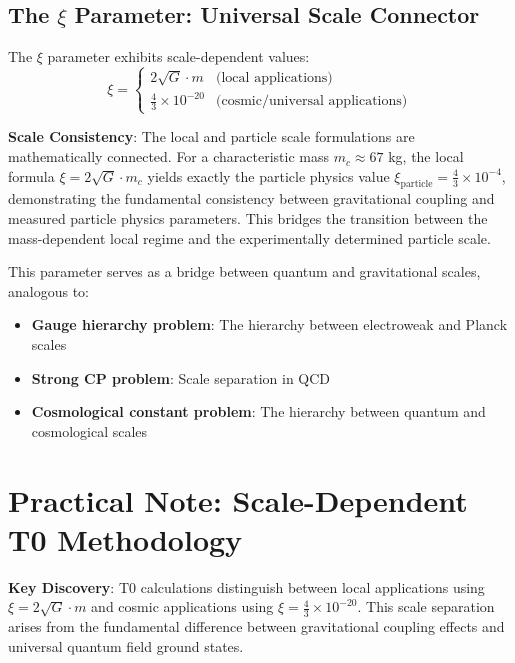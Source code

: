 \documentclass[12pt,a4paper]{article}
\begin{document}
	\subsection{The $\xi$ Parameter: Universal Scale Connector}
	\label{subsec:xi_universal}
	\label{sec:xi_derivation}
	
	The $\xi$ parameter exhibits scale-dependent values:
	\begin{equation}
		\xi = \begin{cases}
			2\sqrt{G} \cdot m & \text{(local applications)} \\
			\frac{4}{3} \times 10^{-20} & \text{(cosmic/universal applications)}
		\end{cases}
	\end{equation}
	
	\textbf{Scale Consistency}: The local and particle scale formulations are mathematically connected. For a characteristic mass $m_c \approx 67$ kg, the local formula $\xi = 2\sqrt{G} \cdot m_c$ yields exactly the particle physics value $\xi_{\text{particle}} = \frac{4}{3} \times 10^{-4}$, demonstrating the fundamental consistency between gravitational coupling and measured particle physics parameters. This bridges the transition between the mass-dependent local regime and the experimentally determined particle scale.
	
	This parameter serves as a bridge between quantum and gravitational scales, analogous to:
	\begin{itemize}
		\item \textbf{Gauge hierarchy problem}: The hierarchy between electroweak and Planck scales \citep{weinberg1995,susskind1979}
		\item \textbf{Strong CP problem}: Scale separation in QCD \citep{peccei1977,weinberg1978}
		\item \textbf{Cosmological constant problem}: The hierarchy between quantum and cosmological scales \citep{weinberg1989,carroll2001}
	\end{itemize}
	
	\section{Practical Note: Scale-Dependent T0 Methodology}
	\label{sec:practical_methodology}
	
	\begin{tcolorbox}[colback=green!5!white,colframe=green!75!black,title=Scale-Dependent T0 Calculation Method]
		\textbf{Key Discovery}: T0 calculations distinguish between local applications using $\xi = 2\sqrt{G} \cdot m$ and cosmic applications using $\xi = \frac{4}{3} \times 10^{-20}$. This scale separation arises from the fundamental difference between gravitational coupling effects and universal quantum field ground states.
	\end{tcolorbox}
	
\end{document}
